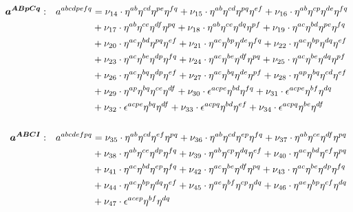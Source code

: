 \documentclass[a4paper,12pt, DIV=14, BCOR=5mm, twoside, headsepline, numbers=noenddot]{scrbook}
\begin{document}
\begin{align}\label{LorentzGR2}
\begin{alignedat}{2}
\boldsymbol{a^{ABpCq}}&: \ \ \ & a^{abcdpefq}  &= \nu_{14}\cdot\eta^{ab}\eta^{cd}\eta^{pe}\eta^{fq}+\nu_{15}\cdot\eta^{ab}\eta^{cd}\eta^{pq}\eta^{ef}
+\nu_{16}\cdot\eta^{ab}\eta^{cp}\eta^{de}\eta^{fq}\\ &  &\hphantom{=} &
+\nu_{17}\cdot\eta^{ab}\eta^{ce}\eta^{df}\eta^{pq}+ 
\nu_{18}\cdot\eta^{ab}\eta^{ce}\eta^{dq}\eta^{pf}+\nu_{19}\cdot\eta^{ac}\eta^{bd}\eta^{pe}\eta^{fq} \\ &  &\hphantom{=} &
+\nu_{20}\cdot\eta^{ac}\eta^{bd}\eta^{pq}\eta^{ef}+\nu_{21}\cdot\eta^{ac}\eta^{bp}\eta^{de}\eta^{fq}+ 
\nu_{22}\cdot\eta^{ac}\eta^{bp}\eta^{dq}\eta^{ef} \\ &  &\hphantom{=} &
+\nu_{23}\cdot\eta^{ac}\eta^{be}\eta^{dp}\eta^{fq}+
\nu_{24}\cdot\eta^{ac}\eta^{be}\eta^{df}\eta^{pq}+\nu_{25}\cdot\eta^{ac}\eta^{be}\eta^{dq}\eta^{pf} \\ &  &\hphantom{=} &
+\nu_{26}\cdot\eta^{ac}\eta^{bq}\eta^{dp}\eta^{ef}+\nu_{27}\cdot\eta^{ac}\eta^{bq}\eta^{de}\eta^{pf}+ 
\nu_{28}\cdot\eta^{ap}\eta^{bq}\eta^{cd}\eta^{ef} \\ &  &\hphantom{=} &
+\nu_{29}\cdot\eta^{ap}\eta^{bq}\eta^{ce}\eta^{df} + \nu_{30}\cdot\epsilon^{acpe}\eta^{bd}\eta^{fq}+\nu_{31}\cdot\epsilon^{acpe}\eta^{bf}\eta^{dq} \\ &  &\hphantom{=} &
+\nu_{32}\cdot\epsilon^{acpe}\eta^{bq}\eta^{df}+\nu_{33}\cdot\epsilon^{acpq}\eta^{bd}\eta^{ef} 
+\nu_{34}\cdot\epsilon^{acpq}\eta^{be}\eta^{df} \\
\\
\boldsymbol{a^{ABCI}}&: \ \ \ & a^{abcdefpq}  &= \nu_{35}\cdot\eta^{ab}\eta^{cd}\eta^{ef}\eta^{pq}+\nu_{36}\cdot\eta^{ab}\eta^{cd}\eta^{ep}\eta^{fq}+\nu_{37}\cdot\eta^{ab}\eta^{ce}\eta^{df}\eta^{pq} \\ &  &\hphantom{=} &
+\nu_{38}\cdot\eta^{ab}\eta^{ce}\eta^{dp}\eta^{fq}+\nu_{39}\cdot\eta^{ab}\eta^{cp}\eta^{dq}\eta^{ef}+\nu_{40}\cdot\eta^{ac}\eta^{bd}\eta^{ef}\eta^{pq}
\\ &  &\hphantom{=} &
+\nu_{41}\cdot\eta^{ac}\eta^{bd}\eta^{ep}\eta^{fq}+\nu_{42}\cdot\eta^{ac}\eta^{be}\eta^{df}\eta^{pq}+\nu_{43}\cdot\eta^{ac}\eta^{be}\eta^{dp}\eta^{fq}
\\ &  &\hphantom{=} &
+\nu_{44}\cdot\eta^{ac}\eta^{bp}\eta^{dq}\eta^{ef}+\nu_{45}\cdot\eta^{ae}\eta^{bf}\eta^{cp}\eta^{dq}+\nu_{46}\cdot\eta^{ae}\eta^{bp}\eta^{cf}\eta^{dq} \\ &  &\hphantom{=} & 
+\nu_{47}\cdot\epsilon^{acep}\eta^{bf}\eta^{dq}
\end{alignedat}
\end{align}
\end{document}
